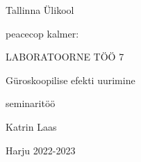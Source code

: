 \begin{titlepage}
\par{Tallinna Ülikool}
\vspace{0.3\textheight}
\par{peacecop kalmer:}
\LARGE
\par{LABORATOORNE TÖÖ 7}
\par{Güroskoopilise efekti uurimine}
\normalsize
\par{seminaritöö}
\vspace{0.3\textheight}
\begin{flushright}
\par{Katrin Laas}
\end{flushright}
\vfill
Harju
\hfill
2022-2023
\end{titlepage}
